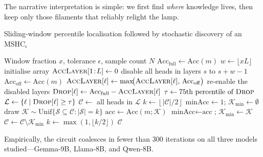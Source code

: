 \documentclass{article}
\begin{document}
The narrative interpretation is simple: we first find \emph{where} knowledge
lives, then keep only those filaments that reliably relight the lamp.
\begin{algorithm}[t]
\caption{Sliding‑window percentile localisation followed by stochastic discovery of an MSHC${}_{\epsilon}$}
\label{alg:mshc}
\begin{algorithmic}[1]
\Require Window fraction $x$, tolerance $\epsilon$, sample count $N$
\State $\mathrm{Acc}_{\mathrm{full}}\gets\mathrm{Acc}(m)$
\State $w\gets\lfloor xL\rfloor$
\State initialise array $\textsc{AccLayer}[1\!:\!L]\gets 0$ 
    \State disable all heads in layers $s$ to $s+w-1$
    \State $\mathrm{Acc}_{\mathrm{off}}\gets\mathrm{Acc}(m)$
        \State $\textsc{AccLayer}[\ell]\gets\max\!\bigl(\textsc{AccLayer}[\ell],\,\mathrm{Acc}_{\mathrm{off}}\bigr)$
    \EndFor
    \State re‑enable the disabled layers
\EndFor
{}
    \State $\textsc{Drop}[\ell]\gets\mathrm{Acc}_{\mathrm{full}} - \textsc{AccLayer}[\ell]$ 
\EndFor
\State $\tau\gets\text{75th percentile of }\textsc{Drop}$
\State $\mathcal{L}\gets\{\ell\;|\;\textsc{Drop}[\ell]\ge\tau\}$ 
\State $\mathcal{C}\gets$ all heads in $\mathcal{L}$ 
\State $k\gets\left\lfloor{|\mathcal C|} / 2 \right\rfloor$
    \Repeat
        \State $\text{minAcc}\gets 1$; $\mathcal K_{\mathrm{min}}\gets\emptyset$
            \State draw $\mathcal K\!\sim\!\mathrm{Unif}\{\mathcal S\subseteq\mathcal C:|\mathcal S|=k\}$
            \State $\text{acc}\gets\mathrm{Acc}(m;\mathcal K)$
                \State $\text{minAcc}\gets\text{acc}$; $\mathcal K_{\mathrm{min}}\gets\mathcal K$
            \EndIf
        \EndFor
            \State $\mathcal C\gets\mathcal C\setminus\mathcal K_{\mathrm{min}}$ 
        \EndIf
    \State $k\gets\max(1,\lfloor k/2\rfloor)$
\EndWhile
\State\Return $\mathcal C$
\end{algorithmic}
\end{algorithm}

Empirically, the circuit coalesces in fewer than 300 iterations on all three
models studied—Gemma-9B, Llama-8B, and Qwen-8B.
\end{document}
